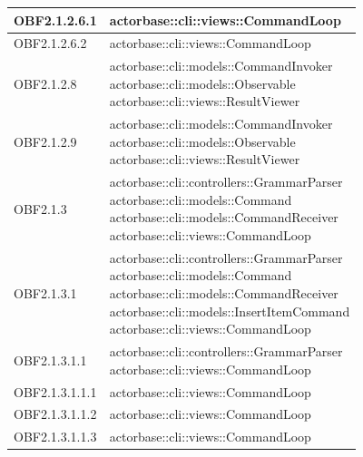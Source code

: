 \documentclass{scalatekids-article}
\begin{document}
\begin{longtable}[H]{|p{4.5cm}|p{13cm}|}
  \hline
  OBF2.1.2.6.1 & \multiLineCell[t]{actorbase::cli::views::CommandLoop\\}\\
  \hline
  OBF2.1.2.6.2 & \multiLineCell[t]{actorbase::cli::views::CommandLoop\\}\\
  \hline
  OBF2.1.2.8 & \multiLineCell[t]{actorbase::cli::models::CommandInvoker\\actorbase::cli::models::Observable\\actorbase::cli::views::ResultViewer\\}\\
  \hline
  OBF2.1.2.9 & \multiLineCell[t]{actorbase::cli::models::CommandInvoker\\actorbase::cli::models::Observable\\actorbase::cli::views::ResultViewer\\}\\
  \hline
  OBF2.1.3 & \multiLineCell[t]{actorbase::cli::controllers::GrammarParser\\actorbase::cli::models::Command\\actorbase::cli::models::CommandReceiver\\actorbase::cli::views::CommandLoop\\}\\
  \hline
  OBF2.1.3.1 & \multiLineCell[t]{actorbase::cli::controllers::GrammarParser\\actorbase::cli::models::Command\\actorbase::cli::models::CommandReceiver\\actorbase::cli::models::InsertItemCommand\\actorbase::cli::views::CommandLoop\\}\\
  \hline
  OBF2.1.3.1.1 & \multiLineCell[t]{actorbase::cli::controllers::GrammarParser\\actorbase::cli::views::CommandLoop\\}\\
  \hline
  OBF2.1.3.1.1.1 & \multiLineCell[t]{actorbase::cli::views::CommandLoop\\}\\
  \hline
  OBF2.1.3.1.1.2 & \multiLineCell[t]{actorbase::cli::views::CommandLoop\\}\\
  \hline
  OBF2.1.3.1.1.3 & \multiLineCell[t]{actorbase::cli::views::CommandLoop\\}\\
  \hline

\end{longtable}
\end{document}
